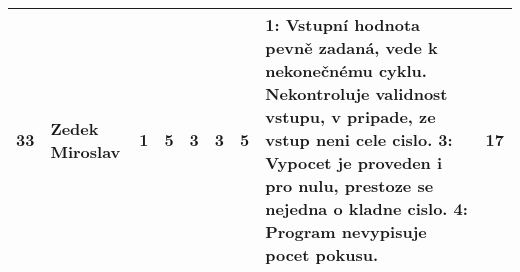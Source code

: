 \documentclass[landscape, 12pt]{article}
\begin{document}
\begin{longtable}{|l l | C{0.7cm} | C{0.7cm} | C{0.7cm} | C{0.7cm} | C{0.7cm} | L{15cm} |c|}
  33 & Zedek Miroslav     &       1 &       5 &       3 &       3 &       5 & 1: Vstupní hodnota pevně zadaná, vede k nekonečnému cyklu. Nekontroluje validnost vstupu, v pripade, ze vstup neni cele cislo. 3: Vypocet je proveden i pro nulu, prestoze se nejedna o kladne cislo. 4: Program nevypisuje pocet pokusu.                                                                                                                                               &       17 \\
\hline
        \end{longtable}
     
\end{document}
